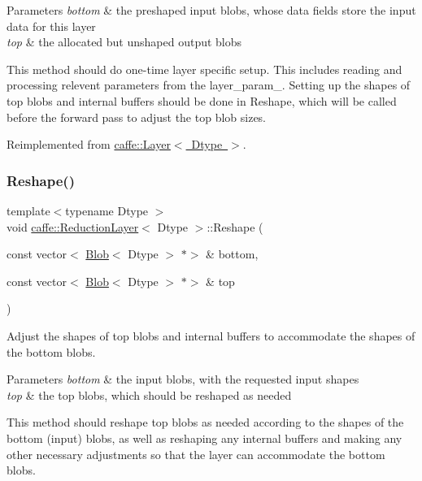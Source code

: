 \begin{DoxyParams}{Parameters}
{\em bottom} & the preshaped input blobs, whose data fields store the input data for this layer \\
\hline
{\em top} & the allocated but unshaped output blobs\\
\hline
\end{DoxyParams}
This method should do one-\/time layer specific setup. This includes reading and processing relevent parameters from the {\ttfamily layer\+\_\+param\+\_\+}. Setting up the shapes of top blobs and internal buffers should be done in {\ttfamily Reshape}, which will be called before the forward pass to adjust the top blob sizes. 

Reimplemented from \mbox{\hyperlink{classcaffe_1_1_layer_a481323a3e0972c682787f2137468c29f}{caffe\+::\+Layer$<$ Dtype $>$}}.

\mbox{\label{classcaffe_1_1_reduction_layer_a0f6594ec41a0556e9fcfb9af0ae86c8a}} 
\subsubsection{\texorpdfstring{Reshape()}{Reshape()}\hspace{0.1cm}{\footnotesize\ttfamily [1/2]}}
{\footnotesize\ttfamily template$<$typename Dtype $>$ \\
void \mbox{\hyperlink{classcaffe_1_1_reduction_layer}{caffe\+::\+Reduction\+Layer}}$<$ Dtype $>$\+::Reshape (\begin{DoxyParamCaption}\item[{const vector$<$ \mbox{\hyperlink{classcaffe_1_1_blob}{Blob}}$<$ Dtype $>$ $\ast$$>$ \&}]{bottom,  }\item[{const vector$<$ \mbox{\hyperlink{classcaffe_1_1_blob}{Blob}}$<$ Dtype $>$ $\ast$$>$ \&}]{top }\end{DoxyParamCaption})\hspace{0.3cm}{\ttfamily [virtual]}}



Adjust the shapes of top blobs and internal buffers to accommodate the shapes of the bottom blobs. 


\begin{DoxyParams}{Parameters}
{\em bottom} & the input blobs, with the requested input shapes \\
\hline
{\em top} & the top blobs, which should be reshaped as needed\\
\hline
\end{DoxyParams}
This method should reshape top blobs as needed according to the shapes of the bottom (input) blobs, as well as reshaping any internal buffers and making any other necessary adjustments so that the layer can accommodate the bottom blobs. 

